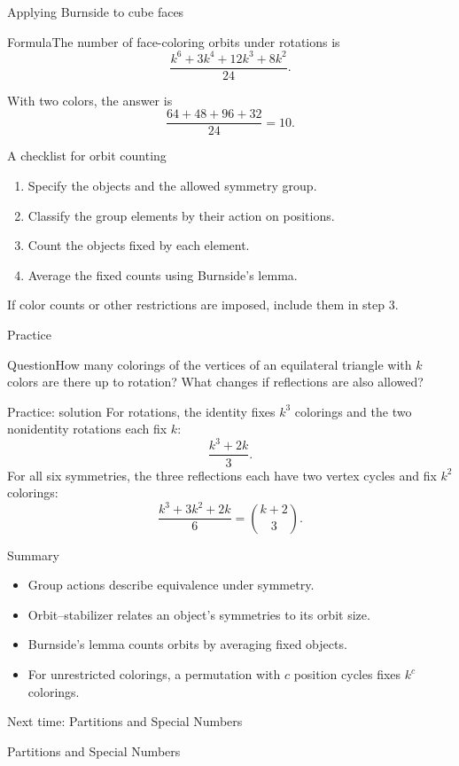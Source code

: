 \documentclass[aspectratio=169,11pt]{beamer}
\newcommand{\Thm}[2]{\begin{block}{#1}#2\end{block}}
\newcommand{\Question}[1]{\begin{block}{Question}#1\end{block}}
\newcommand{\gap}{\par\medskip}
\begin{document}
\begin{frame}{Applying Burnside to cube faces}
\large
\Thm{Formula}{The number of face-coloring orbits under rotations is
\[\frac{k^6+3k^4+12k^3+8k^2}{24}.\]}
\gap With two colors, the answer is
\[\frac{64+48+96+32}{24}=10.\]
\end{frame}
\begin{frame}{A checklist for orbit counting}
\large
\begin{enumerate}
\item Specify the objects and the allowed symmetry group.
\item Classify the group elements by their action on positions.
\item Count the objects fixed by each element.
\item Average the fixed counts using Burnside's lemma.
\end{enumerate}
\gap If color counts or other restrictions are imposed, include them in step 3.
\end{frame}
\begin{frame}{Practice}
\large
\Question{How many colorings of the vertices of an equilateral triangle with $k$ colors are there up to rotation? What changes if reflections are also allowed?}
\end{frame}
\begin{frame}{Practice: solution}
\large
\normalsize
For rotations, the identity fixes $k^3$ colorings and the two nonidentity rotations each fix $k$:
\[\frac{k^3+2k}{3}.\]
For all six symmetries, the three reflections each have two vertex cycles and fix $k^2$ colorings:
\[\frac{k^3+3k^2+2k}{6}=\binom{k+2}{3}.\]
\end{frame}
\begin{frame}{Summary}
\large
\begin{itemize}
\item Group actions describe equivalence under symmetry.
\item Orbit--stabilizer relates an object's symmetries to its orbit size.
\item Burnside's lemma counts orbits by averaging fixed objects.
\item For unrestricted colorings, a permutation with $c$ position cycles fixes $k^c$ colorings.
\end{itemize}
\end{frame}
\begin{frame}{Next time: Partitions and Special Numbers}\begin{center}{\Huge Partitions and Special Numbers}\end{center}\end{frame}
\end{document}
